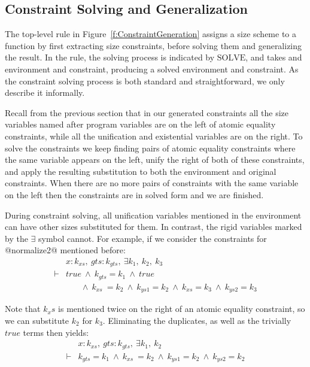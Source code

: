 \subsection{Constraint Solving and Generalization}
The top-level rule in Figure~\ref{f:ConstraintGeneration} assigns a size scheme to a function by first extracting size constraints, before solving them and generalizing the result. In the rule, the solving process is indicated by $\textrm{SOLVE}$, and takes and environment and constraint, producing a solved environment and constraint. As the constraint solving process is both standard and straightforward, we only describe it informally.

Recall from the previous section that in our generated constraints all the size variables named after program variables are on the left of atomic equality constraints, while all the unification and existential variables are on the right. To solve the constraints we keep finding pairs of atomic equality constraints where the same variable appears on the left, unify the right of both of these constraints, and apply the resulting substitution to both the environment and original constraints. When there are no more pairs of constraints with the same variable on the left then the constraints are in solved form and we are finished.

During constraint solving, all unification variables mentioned in the environment can have other sizes substituted for them. In contrast, the rigid variables marked by the $\exists$ symbol cannot. For example, if we consider the constraints for @normalize2@ mentioned before:
$$
\begin{array}{ll}
       & x : k_{xs},~ gts : k_{gts},~ \exists k_1,~ k_2,~ k_3 
\\
\vdash & true 
        ~\wedge~  k_{gts} = k_1
        ~\wedge~  true
\\     &~~~~~~~~ 
          \wedge~  k_{xs}  ~= k_2
        ~ \wedge~  k_{ys1}  = k_2 
        ~ \wedge~  k_{xs}   = k_3
        ~ \wedge~  k_{ys2}  = k_3
\end{array}
$$

Note that $k_xs$ is mentioned twice on the right of an atomic equality constraint, so we can substitute $k_2$ for $k_3$. Eliminating the duplicates, as well as the trivially $true$ terms then yields:
$$
\begin{array}{ll}
       & x : k_{xs},~ gts : k_{gts},~ \exists k_1,~ k_2 
\\
\vdash & k_{gts} = k_1
        ~\wedge~  k_{xs}  ~= k_2
        ~\wedge~  k_{ys1}  = k_2 
        ~\wedge~  k_{ys2}  = k_2
\end{array}
$$

